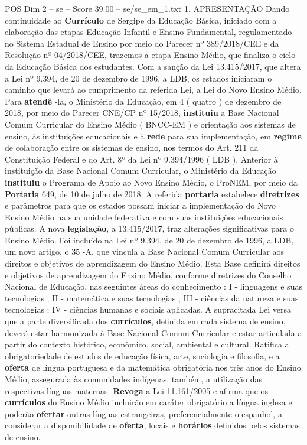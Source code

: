 \begin{textsample}{POS Dim 2 – se – Score 39.00 – se/se\_em\_1.txt}  \label{ex:f2_pos_021}
1.
APRESENTAÇÃO Dando continuidade ao \textbf{Currículo} de Sergipe da Educação Básica, iniciado com a elaboração das etapas Educação Infantil e Ensino Fundamental, regulamentado no Sistema Estadual de Ensino por meio do Parecer nº 389/2018/CEE e da Resolução nº 04/2018/CEE, trazemos a etapa Ensino Médio, que finaliza o ciclo da Educação Básica dos estudantes.
Com a sanção da Lei 13.415/2017, que altera a Lei nº 9.394, de 20 de dezembro de 1996, a LDB, os estados iniciaram o caminho que levará ao cumprimento da referida Lei, a Lei do Novo Ensino Médio.
Para \textbf{atendê} -la, o Ministério da Educação, em 4 ( quatro ) de dezembro de 2018, por meio do Parecer CNE/CP nº 15/2018, \textbf{instituiu} a Base Nacional Comum Curricular do Ensino Médio ( BNCC-EM ) e orientação aos sistemas de ensino, às instituições educacionais e à \textbf{rede} para sua implementação, em \textbf{regime} de colaboração entre os sistemas de ensino, nos termos do Art. 211 da Constituição Federal e do Art. 8º da Lei nº 9.394/1996 ( LDB ).
Anterior à instituição da Base Nacional Comum Curricular, o Ministério da Educação \textbf{instituiu} o Programa de Apoio ao Novo Ensino Médio, o ProNEM, por meio da \textbf{Portaria} 649, de 10 de julho de 2018.
A referida \textbf{portaria} estabelece \textbf{diretrizes} e parâmetros para que os estados possam iniciar a implementação do Novo Ensino Médio na sua unidade federativa e com suas instituições educacionais públicas.
A nova \textbf{legislação}, a 13.415/2017, traz alterações significativas para o Ensino Médio.
Foi incluído na Lei nº 9.394, de 20 de dezembro de 1996, a LDB, um novo artigo, o 35 -A, que vincula a Base Nacional Comum Curricular aos direitos e objetivos de aprendizagem do Ensino Médio.
Esta Base definirá direitos e objetivos de aprendizagem do Ensino Médio, conforme diretrizes do Conselho Nacional de Educação, nas seguintes áreas do conhecimento : I - linguagens e suas tecnologias ; II - matemática e suas tecnologias ; III - ciências da natureza e suas tecnologias ; IV - ciências humanas e sociais aplicadas.
A supracitada Lei versa que a parte diversificada dos \textbf{currículos}, definida em cada sistema de ensino, deverá estar harmonizada à Base Nacional Comum Curricular e estar articulada a partir do contexto histórico, econômico, social, ambiental e cultural.
Ratifica a obrigatoriedade de estudos de educação física, arte, sociologia e filosofia, e a \textbf{oferta} de língua portuguesa e da matemática obrigatória nos três anos do Ensino Médio, assegurada às comunidades indígenas, também, a utilização das respectivas línguas maternas. \textbf{Revoga} a Lei 11.161/2005 e afirma que os \textbf{currículos} do Ensino Médio incluirão em caráter obrigatório a língua inglesa e poderão \textbf{ofertar} outras línguas estrangeiras, preferencialmente o espanhol, a considerar a disponibilidade de \textbf{oferta}, locais e \textbf{horários} definidos pelos sistemas de ensino.

\end{textsample}
